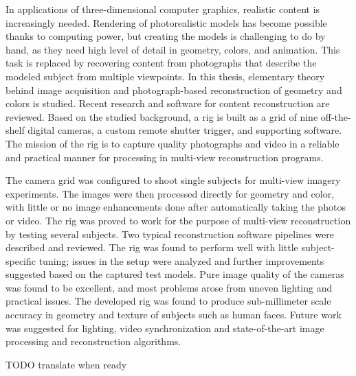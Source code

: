 \begin{abstractpage}[english]
In applications of three-dimensional computer graphics, realistic content is increasingly needed.
Rendering of photorealistic models has become possible thanks to computing power, but creating the models is challenging to do by hand, as they need high level of detail in geometry, colors, and animation.
This task is replaced by recovering content from photographs that describe the modeled subject from multiple viewpoints.
In this thesis, elementary theory behind image acquisition and photograph-based reconstruction of geometry and colors is studied.
Recent research and software for content reconstruction are reviewed.
Based on the studied background, a rig is built as a grid of nine off-the-shelf digital cameras, a custom remote shutter trigger, and supporting software.
The mission of the rig is to capture quality photographs and video in a reliable and practical manner for processing in multi-view reconstruction programs.

The camera grid was configured to shoot single subjects for multi-view imagery experiments.
The images were then processed directly for geometry and color, with little or no image enhancements done after automatically taking the photos or video.
The rig was proved to work for the purpose of multi-view reconstruction by testing several subjects.
Two typical reconstruction software pipelines were described and reviewed.
The rig was found to perform well with little subject-specific tuning;
issues in the setup were analyzed and further improvements suggested based on the captured test models.
Pure image quality of the cameras was found to be excellent, and most problems arose from uneven lighting and practical issues.
The developed rig was found to produce sub-millimeter scale accuracy in geometry and texture of subjects such as human faces.
Future work was suggested for lighting, video synchronization and state-of-the-art image processing and reconstruction algorithms.
\end{abstractpage}

\newpage

\keywords{}
\begin{abstractpage}[finnish]
	TODO translate when ready
\end{abstractpage}
